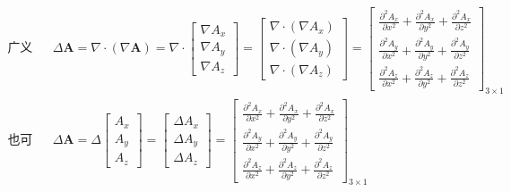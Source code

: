 \documentclass[UTF8]{report}
\theoremstyle{MyLineTheoremStyle} %
\theoremstyle{MyBlockTheoremStyle} %
\theoremstyle{MySubsubsectionStyle} %
\begin{document}
\begin{gather}
\begin{aligned}
    &\text{广义拉普运算：}
    &&\Delta \boldsymbol{A}  = \nabla \cdot (\nabla \boldsymbol{A} ) 
    =
    \nabla \cdot 
    \begin{bmatrix}
        \nabla A_x \\ \nabla A_y \\ \nabla A_z
    \end{bmatrix} 
    = 
    \begin{bmatrix}
        \nabla \cdot (\nabla A_x) \\ \nabla \cdot (\nabla A_y) \\ \nabla \cdot (\nabla A_z)
    \end{bmatrix} 
    =
    \begin{bmatrix}
        \frac{\partial^2 A_x }{\partial x^2 } +\frac{\partial^2 A_x }{\partial y^2 } + \frac{\partial^2 A_x }{\partial z^2 } \\
        \frac{\partial^2 A_y }{\partial x^2 } +\frac{\partial^2 A_y }{\partial y^2 } + \frac{\partial^2 A_y }{\partial z^2 } \\
        \frac{\partial^2 A_z }{\partial x^2 } +\frac{\partial^2 A_z }{\partial y^2 } + \frac{\partial^2 A_z }{\partial z^2 }
    \end{bmatrix}_{3\times 1} \\ 
    & \text{也可理解为：} &&
    \Delta \boldsymbol{A} = 
    \Delta \begin{bmatrix}
        A_x \\ A_y \\ A_z
    \end{bmatrix} = 
    \begin{bmatrix}
        \Delta A_x \\ \Delta A_y \\ \Delta A_z
    \end{bmatrix}
    = 
    \begin{bmatrix}
        \frac{\partial^2 A_x }{\partial x^2 } +\frac{\partial^2 A_x }{\partial y^2 } + \frac{\partial^2 A_x }{\partial z^2 } \\
        \frac{\partial^2 A_y }{\partial x^2 } +\frac{\partial^2 A_y }{\partial y^2 } + \frac{\partial^2 A_y }{\partial z^2 } \\
        \frac{\partial^2 A_z }{\partial x^2 } +\frac{\partial^2 A_z }{\partial y^2 } + \frac{\partial^2 A_z }{\partial z^2 }
    \end{bmatrix}_{3\times 1}
\end{aligned}
\end{gather}
\end{document}
